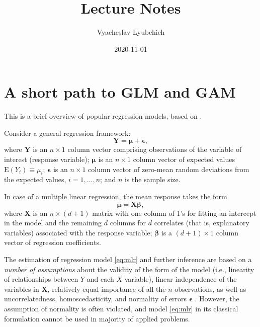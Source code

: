 \documentclass[
]{book}
\title{Lecture Notes}
\author{Vyacheslav Lyubchich}
\date{2020-11-01}
\begin{document}
\maketitle

{
\setcounter{tocdepth}{1}
\tableofcontents
}
\hypertarget{GLM}{%
\chapter{A short path to GLM and GAM}\label{GLM}}

This is a brief overview of popular regression models, based on \citet{Lyubchich:etal:2019:wires}.

Consider a general regression framework:
\begin{equation}
    \label{eq:general}
    \mathbf{Y} = \boldsymbol{\mu} + \boldsymbol{\epsilon},
\end{equation}
where \(\mathbf{Y}\) is an \(n\times1\) column vector comprising observations of the variable of interest (response variable); \(\boldsymbol{\mu}\) is an \(n\times1\) column vector of expected values \(\mathrm{E}(Y_i) \equiv \mu_i\); \(\boldsymbol{\epsilon}\) is an \(n\times1\) column vector of zero-mean random deviations from the expected values, \(i = 1,\ldots,n\); and \(n\) is the sample size.

In case of a multiple linear regression, the mean response takes the form
\begin{equation}
    \label{eq:mlr}
    \boldsymbol{\mu} = \mathbf{X}\boldsymbol{\beta},
\end{equation}
where \(\mathbf{X}\) is an \(n\times(d+1)\) matrix with one column of 1's for fitting an intercept in the model and the remaining \(d\) columns for \(d\) correlates (that is, explanatory variables) associated with the response variable; \(\boldsymbol{\beta}\) is a \((d+1)\times 1\) column vector of regression coefficients.

The estimation of regression model \eqref{eq:mlr} and further inference are based on a \emph{number of assumptions} about the validity of the form of the model (i.e., linearity of relationships between \(Y\) and each \(X\) variable), linear independence of the variables in \(\mathbf{X}\), relatively equal importance of all the \(n\) observations, as well as uncorrelatedness, homoscedasticity, and normality of errors \(\boldsymbol{\epsilon}\) \citep{Chatterjee:Hadi:2006}. However, the assumption of normality is often violated, and model \eqref{eq:mlr} in its classical formulation cannot be used in majority of applied problems.
\end{document}
